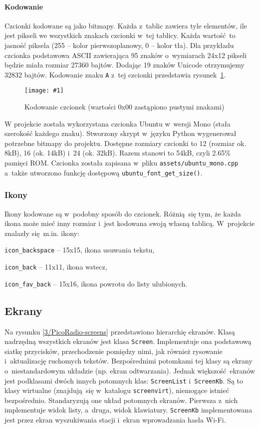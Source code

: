 \documentclass[polish]{aghengthesis}
\let\tempone\itemize
\let\temptwo\enditemize
\renewenvironment{itemize}{\tempone\setlength{\itemsep}{0cm}}{\temptwo}
\newcommand{\imgint}[4]{
	\begin{figure}[{#4}]
		\centering
		\texttt{[image: \#1]}
		\caption{#2}
		\label{#1}
	\end{figure}
}
\newcommand{\imgh}[3]{\imgint{#1}{#2}{#3}{H}}
\begin{document}
				\paragraph{Kodowanie}
					Czcionki kodowane są jako bitmapy. Każda z~tablic zawiera tyle elementów, ile jest pikseli we wszystkich znakach czcionki w~tej tablicy. Każda wartość to jasność piksela (255 -- kolor pierwszoplanowy, 0 -- kolor tła). Dla przykładu czcionka podstawowa ASCII zawierająca 95 znaków o~wymiarach 24x12 pikseli będzie miała rozmiar 27360 bajtów. Dodając 19 znaków Unicode otrzymujemy 32832 bajtów. Kodowanie znaku \lstinline|A| z~tej czcionki przedstawia rysunek~\ref{3/PicoRadio-screen-font}.
				
				\imgh{3/PicoRadio-screen-font}{Kodowanie czcionek (wartości 0x00 zastąpiono pustymi znakami)}{0.6}
				
				W projekcie została wykorzystana czcionka Ubuntu\textsuperscript{\cite{ubuntu_font}} w~wersji Mono (stała szerokość każdego znaku). Stworzony skrypt w~języku Python wygenerował potrzebne bitmapy do projektu. Dostępne rozmiary czcionki to 12 (rozmiar ok. 8kB), 16 (ok. 14kB) i~24 (ok. 32kB). Razem stanowi to 54kB, czyli 2.65\% pamięci ROM. Czcionka została zapisana w~pliku \lstinline|assets/ubuntu_mono.cpp| a~także utworzono funkcję dostępową \lstinline|ubuntu_font_get_size()|. 
				
			\subsubsection{Ikony}
				Ikony kodowane są w~podobny sposób do czcionek. Różnią się tym, że każda ikona może mieć inny rozmiar i~jest kodowana swoją własną tablicą. W~projekcie znalazły się m.in. ikony:
				\begin{itemize}
					\item \lstinline|icon_backspace| -- 15x15, ikona usuwania tekstu,
					\item \lstinline|icon_back| -- 11x11, ikona wstecz,
					\item \lstinline|icon_fav_back| -- 15x16, ikona powrotu do listy ulubionych.
				\end{itemize}
		
		\subsection{Ekrany}
			Na rysunku \ref{3/PicoRadio-screens} przedstawiono hierarchię ekranów. Klasą nadrzędną wszystkich ekranów jest klasa \lstinline|Screen|. Implementuje ona podstawową siatkę przycisków, przechodzenie pomiędzy nimi, jak również rysowanie i~aktualizację ruchomych tekstów. Bezpośrednimi potomkami tej klasy są ekrany o~niestandardowym układzie (np. ekran odtwarzania). Jednak większość ekranów jest podklasami dwóch innych potomnych klas: \lstinline|ScreenList| i~\lstinline|ScreenKb|. Są to klasy wirtualne (znajdują się w~katalogu \lstinline|screenvirt|), niemogące istnieć bezpośrednio. Standaryzują one układ potomnych ekranów. Pierwsza z~nich implementuje widok listy, a~druga, widok klawiatury. \lstinline|ScreenKb| implementowana jest przez ekran wyszukiwania stacji i~ekran wprowadzania hasła Wi-Fi.
			
\end{document}
